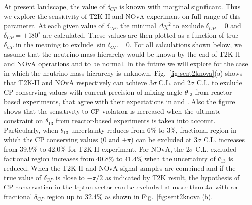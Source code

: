 \documentclass[a4 paper,12pt]{report}%
\begin{document}
At present landscape, the value of $\delta_{CP}$ is known with marginal significant. Thus we explore the sensitivity of T2K-II and NOvA experiment on full range of this parameter. At each given value of $\delta_{CP}$, the minimal $\Delta \chi^2$ to exclude $\delta_{CP} = 0$ and $\delta_{CP} = \pm 180^{\circ}$ are calculated. These values are then plotted as a function of true $\delta_{CP}$ in the meaning to exclude $\sin\delta_{CP} = 0$. For all calculations shown below, we assume that the neutrino mass hierarchy would be known by the end of T2K-II and NOvA operations and to be normal. In the future we will explore for the case in which the neutrino mass hierarchy is unknown. Fig.~\ref{fig:sent2knova}(a) shows that T2K-II and NOvA respectively can achieve 3$\sigma$ C.L. and 2$\sigma$ C.L. to exclude CP-conserving values with current precision of mixing angle $\theta_{13}$ from reactor-based experiments, that agree with their expectations in \cite{Abe:2016tez} and \cite{sanchez_mayly_2018_1286758}. Also the figure shows that the sensitivity to CP violation is increased when the ultimate constraint on $\theta_{13}$ from reactor-based experiments is taken into account. Particularly, when $\theta_{13}$ uncertainty reduces from 6$\%$ to 3$\%$, fractional region in which the CP conserving values (0 and $\pm \pi$) can be excluded at 3$\sigma$ C.L. increases from 39.9$\%$ to 42.0$\%$ for T2K-II experiment. For NOvA, the 2$\sigma$ C.L.-excluded factional region increases from 40.8$\%$ to 41.4$\%$ when the uncertainty of $\theta_{13}$ is reduced. When the T2K-II and NOvA signal samples are combined and if the true value of $\delta_{CP}$ is close to $-\pi/2$ as indicated by T2K result, the hypothesis of CP conservation in the lepton sector can be excluded at more than 4$\sigma$ with an fractional $\delta_{CP}$ region up to 32.4$\%$ as shown in Fig.~\ref{fig:sent2knova}(b).
\end{document}
